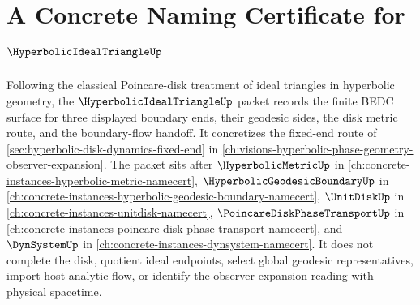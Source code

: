 \chapter{A Concrete Naming Certificate for $\HyperbolicIdealTriangleUp$}
\label{ch:concrete-instances-hyperbolic-ideal-triangle-namecert}

Following the classical Poincare-disk treatment of ideal triangles in hyperbolic geometry, the $\HyperbolicIdealTriangleUp$ packet records the finite BEDC surface for three displayed boundary ends, their geodesic sides, the disk metric route, and the boundary-flow handoff. It concretizes the fixed-end route of \autoref{sec:hyperbolic-disk-dynamics-fixed-end} in \autoref{ch:visions-hyperbolic-phase-geometry-observer-expansion}. The packet sits after $\HyperbolicMetricUp$ in \autoref{ch:concrete-instances-hyperbolic-metric-namecert}, $\HyperbolicGeodesicBoundaryUp$ in \autoref{ch:concrete-instances-hyperbolic-geodesic-boundary-namecert}, $\UnitDiskUp$ in \autoref{ch:concrete-instances-unitdisk-namecert}, $\PoincareDiskPhaseTransportUp$ in \autoref{ch:concrete-instances-poincare-disk-phase-transport-namecert}, and $\DynSystemUp$ in \autoref{ch:concrete-instances-dynsystem-namecert}. It does not complete the disk, quotient ideal endpoints, select global geodesic representatives, import host analytic flow, or identify the observer-expansion reading with physical spacetime.

